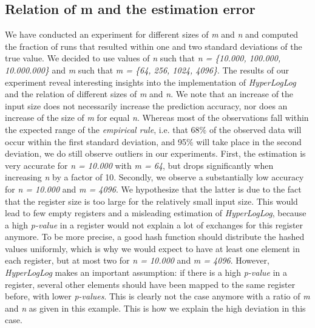\documentclass[12pt, a4paper]{article}
\begin{document}
\subsection{Relation of m and the estimation error}

We have conducted an experiment for different sizes of \emph{m} and \emph{n} and computed the fraction of runs that resulted within one and two standard deviations of the true value. We decided to use values of \emph{n} such that \emph{n = \{10.000, 100.000, 10.000.000\}} and \emph{m} such that \emph{m = \{64, 256, 1024, 4096\}}. The results of our experiment reveal  interesting insights into the implementation of \emph{HyperLogLog} and the relation of different sizes of \emph{m} and \emph{n}.
We note that an increase of the input size does not necessarily increase the prediction accuracy, nor does an increase of the size of \emph{m} for equal \emph{n}.  
Whereas most of the observations fall within the expected range of the \emph{empirical rule}, i.e. that 68\% of the observed data will occur within the first standard deviation, and 95\% will take place in the second deviation, we do still observe outliers in our experiments. 
First, the estimation is very accurate for \emph{n = 10.000} with \emph{m = 64}, but drops significantly when increasing \emph{n} by a factor of 10. Secondly, we observe a substantially low accuracy for \emph{n = 10.000} and \emph{m = 4096}. We hypothesize that the latter is due to the fact that the register size is too large for the relatively small input size. This would lead to few empty registers and a misleading estimation of \emph{HyperLogLog}, because a high \emph{p-value} in a register would not explain a lot of exchanges for this register anymore. To be more precise, a good hash function should distribute the hashed values uniformly, which is why we would expect to have at least one element in each register, but at most two for \emph{n = 10.000} and \emph{m = 4096}. However, \emph{HyperLogLog} makes an important assumption: if there is a high \emph{p-value} in a register, several other elements should have been mapped to the same register before, with lower \emph{p-values}. This is clearly not the case anymore with a ratio of \emph{m} and \emph{n} as given in this example. This is how we explain the high deviation in this case. 
\end{document}
